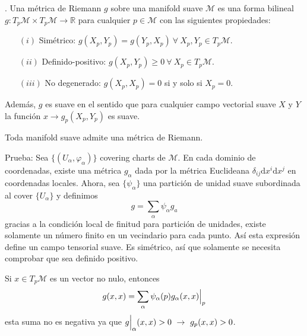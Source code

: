 \documentclass[../main]{subfiles}
\begin{document}
\begin{adjustwidth}{0pt}{-100pt}
. Una métrica de Riemann $g$ sobre una manifold suave $\mathcal{M}$ es una forma bilineal $g: T_p \mathcal{M}\times T_p \mathcal{M} \rightarrow \mathbb{R}$ para cualquier $p\in \mathcal{M}$ con las siguientes propiedades:
\begin{enumerate}
    \item[$(i)$] Simétrico: $g(X_p, Y_p)=g(Y_p, X_p) \ \forall \ X_p, Y_p \in T_p\mathcal{M}$.
    \item[$(ii)$] Definido-positivo: $g(X_p, Y_p)\geq 0 \ \forall \ X_p \in T_p \mathcal{M}$. 
    \item[$(iii)$] No degenerado: $g(X_p, X_p)=0$ si y solo si $X_p=0$.  
\end{enumerate}

Además, $g$ es suave en el sentido que para cualquier campo vectorial suave $X$ y $Y$ la función $x\rightarrow g_p(X_p, Y_p)$ es suave.

 Toda manifold suave admite una métrica de Riemann.

Prueba: Sea $\{(U_{\alpha}, \varphi_{\alpha})\}$ covering charts de $\mathcal{M}$. En cada dominio de coordenadas, existe una métrica $g_{\alpha}$ dada por la métrica Euclideana $\delta_{ij}\mathrm{d}x^{i}\mathrm{d}x^{j}$ en coordenadas locales. Ahora, sea $\{\psi_{\alpha}\}$ una partición de unidad suave subordinada al cover $\{U_{\alpha}\}$ y definimos
\begin{equation}
    g=\sum_{\alpha}\psi_{\alpha}g_{a}
\end{equation}
gracias a la condición local de finitud para partición de unidades, existe solamente un número finito en un vecindario para cada punto. Así esta expresión define un campo tensorial suave. Es simétrico, así que solamente se necesita comprobar que sea definido positivo. 

Si $x \in T_p\mathcal{M}$ es un vector no nulo, entonces
\begin{equation}
    g(x, x)=\sum_{\alpha} \psi_{\alpha}(p) g_{\alpha}(x, x)\Big{|}_p
\end{equation}
esta suma no es negativa ya que $g\Big{|}_{\alpha}(x, x)>0 \ \rightarrow \ g_p(x, x)>0$.


\end{adjustwidth}
\end{document}
